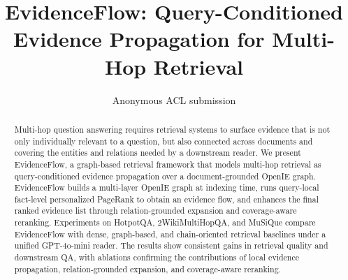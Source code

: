 \documentclass[11pt]{article}
\title{EvidenceFlow: Query-Conditioned Evidence Propagation for Multi-Hop Retrieval}
\author{Anonymous ACL submission}
\newcommand{\methodname}{EvidenceFlow}
\begin{document}
\maketitle

\begin{abstract}
Multi-hop question answering requires retrieval systems to surface
evidence that is not only individually relevant to a question, but also
connected across documents and covering the entities and relations needed
by a downstream reader. We present \methodname{}, a graph-based retrieval
framework that models multi-hop retrieval as query-conditioned evidence
propagation over a document-grounded OpenIE graph. \methodname{} builds a
multi-layer OpenIE graph at indexing time, runs query-local fact-level
personalized PageRank to obtain an evidence flow, and enhances the final
ranked evidence list through relation-grounded expansion and
coverage-aware reranking. Experiments on HotpotQA, 2WikiMultiHopQA, and
MuSiQue compare \methodname{} with dense, graph-based, and
chain-oriented retrieval baselines under a unified GPT-4o-mini reader.
The results show consistent gains in retrieval quality and downstream QA,
with ablations confirming the contributions of local evidence
propagation, relation-grounded expansion, and coverage-aware reranking.
\end{abstract}









\appendix

\end{document}
